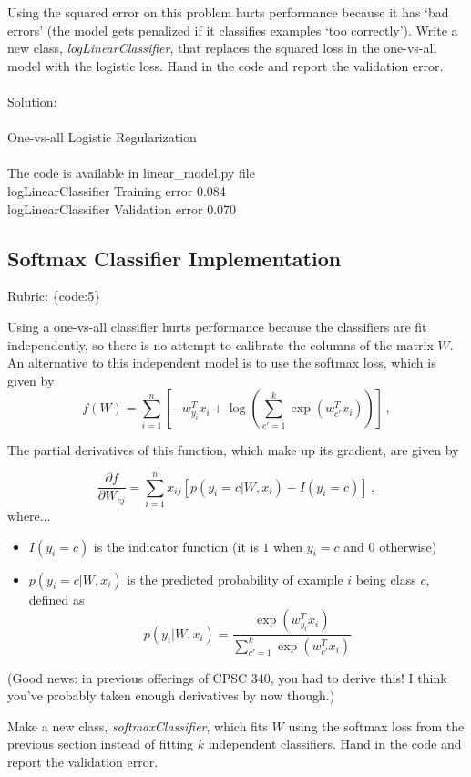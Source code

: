 \documentclass{article}
\def\rubric#1{\gre{Rubric: \{#1\}}}{}
\def\blu#1{{\color{blu}#1}}
\def\gre#1{{\color{gre}#1}}
\begin{document}
Using the squared error on this problem hurts performance because it has `bad errors' (the model gets penalized if it classifies examples `too correctly').
Write a new class, \emph{logLinearClassifier}, that replaces the squared loss in the one-vs-all model with the logistic loss. \blu{Hand in the code and report the validation error}. \\ \\ 
\blu{Solution: \\ \\
One-vs-all Logistic Regularization \\ \\
The code is available in linear\_model.py file \\
logLinearClassifier Training error 0.084\\
logLinearClassifier Validation error  0.070
}
\subsection{Softmax Classifier Implementation}
\rubric{code:5}

Using a one-vs-all classifier hurts performance because the classifiers are fit independently, so there is no attempt to calibrate the columns of the matrix $W$. An alternative to this independent model is to use the softmax loss, which is given by
\[
f(W) = \sum_{i=1}^n \left[-w_{y_i}^Tx_i + \log\left(\sum_{c' = 1}^k \exp(w_{c'}^Tx_i)\right)\right] \, ,
\]

The partial derivatives of this function, which make up its gradient, are given by

\[
\frac{\partial f}{\partial W_{cj}} = \sum_{i=1}^n x_{ij}[p(y_i=c | W,x_i) - I(y_i = c)] \, ,
\]
where... 
\begin{itemize}
\item $I(y_i = c)$ is the indicator function (it is $1$ when $y_i=c$ and $0$ otherwise)
\item $p(y_i=c | W, x_i)$ is the predicted probability of example $i$ being class $c$, defined as
\[
p(y_i | W, x_i) = \frac{\exp(w_{y_i}^Tx_i)}{\sum_{c'=1}^k\exp(w_{c'}^Tx_i)}
\]

\end{itemize}


(Good news: in previous offerings of CPSC 340, you had to derive this! I think you've probably taken enough derivatives by now though.)

Make a new class, \emph{softmaxClassifier}, which fits $W$ using the softmax loss from the previous section instead of fitting $k$ independent classifiers. \blu{Hand in the code and report the validation error}.
\end{document}
